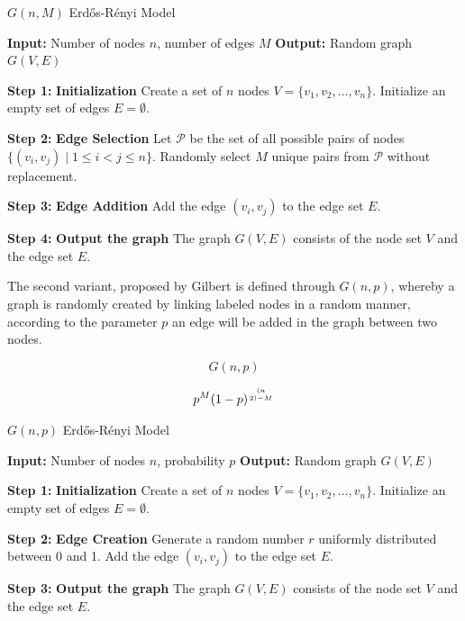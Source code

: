 \begin{algorithm}
\caption{\( G(n, M) \) Erdős-Rényi Model}\label{alg:GnM}
\begin{algorithmic}[1]
\State \textbf{Input:} Number of nodes \( n \), number of edges \( M \)
\State \textbf{Output:} Random graph \( G(V, E) \)

\State \textbf{Step 1:} \textbf{Initialization}
\State Create a set of \( n \) nodes \( V = \{v_1, v_2, \dots, v_n\} \).
\State Initialize an empty set of edges \( E = \emptyset \).

\State \textbf{Step 2:} \textbf{Edge Selection}
\State Let \( \mathcal{P} \) be the set of all possible pairs of nodes \( \{(v_i, v_j) \mid 1 \leq i < j \leq n\} \).
\State Randomly select \( M \) unique pairs from \( \mathcal{P} \) without replacement.

\State \textbf{Step 3:} \textbf{Edge Addition}
    \State Add the edge \( (v_i, v_j) \) to the edge set \( E \).
\EndFor

\State \textbf{Step 4:} \textbf{Output the graph}
\State The graph \( G(V, E) \) consists of the node set \( V \) and the edge set \( E \).
\end{algorithmic}
\end{algorithm}

The second variant, proposed by Gilbert is defined through $G(n,p)$, whereby a graph is randomly created by linking labeled nodes in a random manner, according to the parameter $p$ an edge will be added in the graph between two nodes. 

\begin{equation}
    G(n,p)
\end{equation}

\begin{equation}
    p^M(1-p)^{(n \atop 2)-M}
\end{equation}

\begin{algorithm}
\caption{\( G(n, p) \) Erdős-Rényi Model}\label{alg:Gnp}
\begin{algorithmic}[1]
\State \textbf{Input:} Number of nodes \( n \), probability \( p \)
\State \textbf{Output:} Random graph \( G(V, E) \)

\State \textbf{Step 1:} \textbf{Initialization}
\State Create a set of \( n \) nodes \( V = \{v_1, v_2, \dots, v_n\} \).
\State Initialize an empty set of edges \( E = \emptyset \).

\State \textbf{Step 2:} \textbf{Edge Creation}
    \State Generate a random number \( r \) uniformly distributed between 0 and 1.
        \State Add the edge \( (v_i, v_j) \) to the edge set \( E \).
    \EndIf
\EndFor

\State \textbf{Step 3:} \textbf{Output the graph}
\State The graph \( G(V, E) \) consists of the node set \( V \) and the edge set \( E \).
\end{algorithmic}
\end{algorithm}


